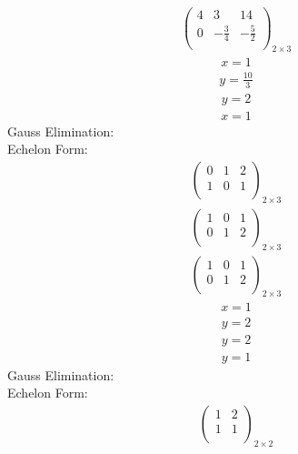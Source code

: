 \documentclass{article}
\begin{document}
\begin{align*}
\left(
\begin{array}{cc|c}
4 & 3 & 14\\
0 & -\frac{3}{4} & -\frac{5}{2}\\
\end{array}
\right)_{2\times 3}
\end{align*}
\begin{align*}
x=1\end{align*}
\begin{align*}
y=\frac{10}{3}\end{align*}
\begin{align*}
y=2\end{align*}
\begin{align*}
x=1\end{align*}
Gauss Elimination:\\
Echelon Form:\\
\begin{align*}
\left(
\begin{array}{cc|c}
0 & 1 & 2\\
1 & 0 & 1\\
\end{array}
\right)_{2\times 3}
\end{align*}
\begin{align*}
\left(
\begin{array}{cc|c}
1 & 0 & 1\\
0 & 1 & 2\\
\end{array}
\right)_{2\times 3}
\end{align*}
\begin{align*}
\left(
\begin{array}{cc|c}
1 & 0 & 1\\
0 & 1 & 2\\
\end{array}
\right)_{2\times 3}
\end{align*}
\begin{align*}
x=1\end{align*}
\begin{align*}
y=2\end{align*}
\begin{align*}
y=2\end{align*}
\begin{align*}
y=1\end{align*}
Gauss Elimination:\\
Echelon Form:\\
\begin{align*}
\left(
\begin{array}{c|c}
1 & 2\\
1 & 1\\
\end{array}
\right)_{2\times 2}
\end{align*}
\end{document}
